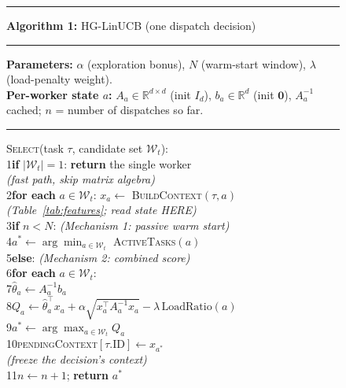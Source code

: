 \documentclass[final,5p,times,twocolumn]{elsarticle}
\begin{document}
\begin{figure}[H]
\centering
\begin{minipage}{\columnwidth}
\footnotesize
\hrule\vspace{3pt}
\textbf{Algorithm 1:} HG-LinUCB (one dispatch decision)
\vspace{3pt}\hrule\vspace{4pt}
\noindent\textbf{Parameters:} $\alpha$ (exploration bonus), $N$ (warm-start window), $\lambda$ (load-penalty weight).\\
\noindent\textbf{Per-worker state $a$:} $A_a\in\mathbb{R}^{d\times d}$ (init $I_d$), $b_a\in\mathbb{R}^d$ (init $\mathbf{0}$), $A_a^{-1}$ cached; $n$ = number of dispatches so far.
\vspace{4pt}\hrule\vspace{4pt}
\noindent\textsc{Select}(task $\tau$, candidate set $\mathcal{W}_t$):\\
\hspace*{0.6em}1\quad \textbf{if} $|\mathcal{W}_t|=1$: \textbf{return} the single worker\\
\hspace*{2.2em}\textit{(fast path, skip matrix algebra)}\\
\hspace*{0.6em}2\quad \textbf{for each} $a\in\mathcal{W}_t$: $x_a\leftarrow$ \textsc{BuildContext}$(\tau,a)$\\
\hspace*{2.2em}\textit{(Table~\ref{tab:features}; read state HERE)}\\
\hspace*{0.6em}3\quad \textbf{if} $n<N$: \textit{(Mechanism 1: passive warm start)}\\
\hspace*{0.6em}4\quad\quad $a^*\leftarrow\arg\min_{a\in\mathcal{W}_t}$ \textsc{ActiveTasks}$(a)$\\
\hspace*{0.6em}5\quad \textbf{else}: \textit{(Mechanism 2: combined score)}\\
\hspace*{0.6em}6\quad\quad \textbf{for each} $a\in\mathcal{W}_t$:\\
\hspace*{0.6em}7\quad\quad\quad $\hat\theta_a\leftarrow A_a^{-1}b_a$\\
\hspace*{0.6em}8\quad\quad\quad $Q_a\leftarrow\hat\theta_a^\top x_a+\alpha\sqrt{x_a^\top A_a^{-1}x_a}-\lambda\,\text{LoadRatio}(a)$\\
\hspace*{0.6em}9\quad\quad $a^*\leftarrow\arg\max_{a\in\mathcal{W}_t}Q_a$\\
\hspace*{0.3em}10\quad \textsc{pendingContext}$[\tau.\text{ID}]\leftarrow x_{a^*}$\\
\hspace*{2.2em}\textit{(freeze the decision's context)}\\
\hspace*{0.3em}11\quad $n\leftarrow n+1$; \textbf{return} $a^*$
\vspace{4pt}


\end{minipage}
\end{figure}
\end{document}
